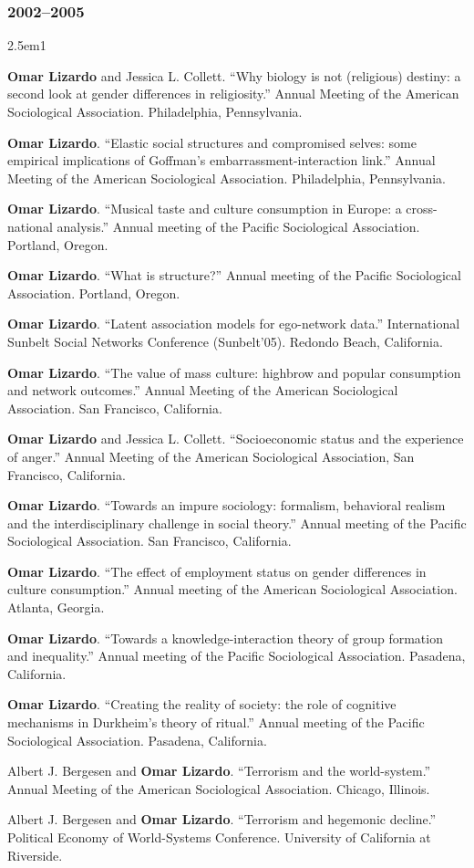 \documentclass[
]{article}
\newenvironment{cventry}{\begin{hangparas}{2.5em}{1}}{\end{hangparas}}
\begin{document}
\subsubsection{2002--2005}\label{section-30}

\begin{cventry}

\textbf{Omar Lizardo} and Jessica L. Collett. ``Why biology is not
(religious) destiny: a second look at gender differences in
religiosity.'' Annual Meeting of the American Sociological Association.
Philadelphia, Pennsylvania.

\textbf{Omar Lizardo}. ``Elastic social structures and compromised
selves: some empirical implications of Goffman's
embarrassment-interaction link.'' Annual Meeting of the American
Sociological Association. Philadelphia, Pennsylvania.

\textbf{Omar Lizardo}. ``Musical taste and culture consumption in
Europe: a cross-national analysis.'' Annual meeting of the Pacific
Sociological Association. Portland, Oregon.

\textbf{Omar Lizardo}. ``What is structure?'' Annual meeting of the
Pacific Sociological Association. Portland, Oregon.

\textbf{Omar Lizardo}. ``Latent association models for ego-network
data.'' International Sunbelt Social Networks Conference (Sunbelt'05).
Redondo Beach, California.

\textbf{Omar Lizardo}. ``The value of mass culture: highbrow and popular
consumption and network outcomes.'' Annual Meeting of the American
Sociological Association. San Francisco, California.

\textbf{Omar Lizardo} and Jessica L. Collett. ``Socioeconomic status and
the experience of anger.'' Annual Meeting of the American Sociological
Association, San Francisco, California.

\textbf{Omar Lizardo}. ``Towards an impure sociology: formalism,
behavioral realism and the interdisciplinary challenge in social
theory.'' Annual meeting of the Pacific Sociological Association. San
Francisco, California.

\textbf{Omar Lizardo}. ``The effect of employment status on gender
differences in culture consumption.'' Annual meeting of the American
Sociological Association. Atlanta, Georgia.

\textbf{Omar Lizardo}. ``Towards a knowledge-interaction theory of group
formation and inequality.'' Annual meeting of the Pacific Sociological
Association. Pasadena, California.

\textbf{Omar Lizardo}. ``Creating the reality of society: the role of
cognitive mechanisms in Durkheim's theory of ritual.'' Annual meeting of
the Pacific Sociological Association. Pasadena, California.

Albert J. Bergesen and \textbf{Omar Lizardo}. ``Terrorism and the
world-system.'' Annual Meeting of the American Sociological Association.
Chicago, Illinois.

Albert J. Bergesen and \textbf{Omar Lizardo}. ``Terrorism and hegemonic
decline.'' Political Economy of World-Systems Conference. University of
California at Riverside.

\end{cventry}
\end{document}
